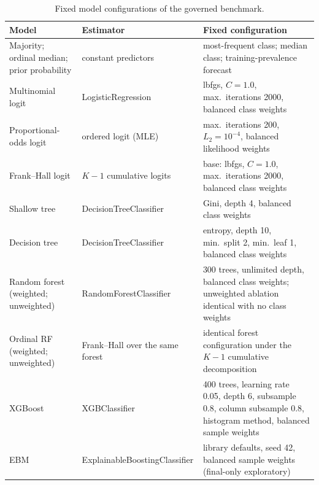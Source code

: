 \documentclass[11pt,letterpaper]{article}
\newcommand{\tabnote}[1]{\par\vspace{3pt}{\footnotesize\singlespacing\itshape #1\par}}
\begin{document}
\begin{table}[H]
\centering
\caption{Fixed model configurations of the governed benchmark.}
\label{tab:hyperparameters}
\footnotesize
\begin{tabularx}{\textwidth}{@{}L{0.26\textwidth}L{0.24\textwidth}Y@{}}
\toprule
\textbf{Model} & \textbf{Estimator} & \textbf{Fixed configuration} \\
\midrule
Majority; ordinal median; prior probability & constant predictors & most-frequent class; median class; training-prevalence forecast \\
Multinomial logit & LogisticRegression & lbfgs, $C=1.0$, max.\ iterations 2000, balanced class weights \\
Proportional-odds logit & ordered logit (MLE) & max.\ iterations 200, $L_2=10^{-4}$, balanced likelihood weights \\
Frank--Hall logit & $K{-}1$ cumulative logits & base: lbfgs, $C=1.0$, max.\ iterations 2000, balanced class weights \\
Shallow tree & DecisionTreeClassifier & Gini, depth 4, balanced class weights \\
Decision tree & DecisionTreeClassifier & entropy, depth 10, min.\ split 2, min.\ leaf 1, balanced class weights \\
Random forest (weighted; unweighted) & RandomForestClassifier & 300 trees, unlimited depth, balanced class weights; unweighted ablation identical with no class weights \\
Ordinal RF (weighted; unweighted) & Frank--Hall over the same forest & identical forest configuration under the $K{-}1$ cumulative decomposition \\
XGBoost & XGBClassifier & 400 trees, learning rate 0.05, depth 6, subsample 0.8, column subsample 0.8, histogram method, balanced sample weights \\
EBM & ExplainableBoostingClassifier & library defaults, seed 42, balanced sample weights (final-only exploratory) \\
\bottomrule
\end{tabularx}
\tabnote{RF = random forest; EBM = Explainable Boosting Machine; MLE = maximum-likelihood estimation. ``Balanced'' weights follow the inverse-prevalence convention of scikit-learn. The machine-readable ledger records the complete parameter set per registry entry.}
\end{table}

\clearpage
\end{document}
